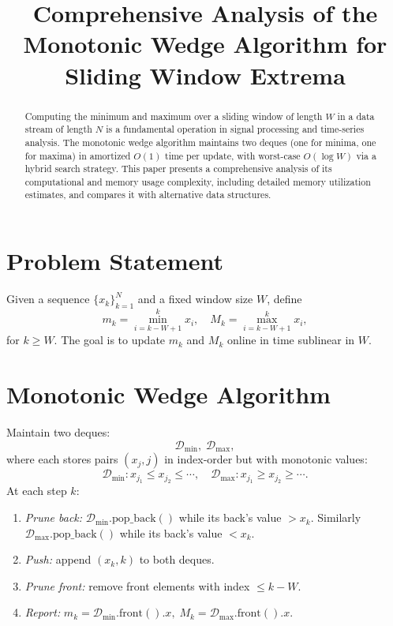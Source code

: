 \documentclass[12pt]{article}
\title{Comprehensive Analysis of the Monotonic Wedge Algorithm for Sliding Window Extrema}
\date{}
\begin{document}
\maketitle

\begin{abstract}
Computing the minimum and maximum over a sliding window of length \(W\) in a data stream of length \(N\) is a fundamental operation in signal processing and time-series analysis.  The monotonic wedge algorithm maintains two deques (one for minima, one for maxima) in amortized \(O(1)\) time per update, with worst-case \(O(\log W)\) via a hybrid search strategy.  This paper presents a comprehensive analysis of its computational and memory usage complexity, including detailed memory utilization estimates, and compares it with alternative data structures.
\end{abstract}

\section{Problem Statement}
Given a sequence \(\{x_k\}_{k=1}^N\) and a fixed window size \(W\), define
\[
m_k = \min_{i=k-W+1}^k x_i,
\quad
M_k = \max_{i=k-W+1}^k x_i,
\]
for \(k\ge W\).  The goal is to update \(m_k\) and \(M_k\) online in time sublinear in \(W\).

\section{Monotonic Wedge Algorithm}
Maintain two deques:
\[
\mathcal{D}_{\min},\;\mathcal{D}_{\max},
\]
where each stores pairs \((x_j,j)\) in index‐order but with monotonic values:
\[
\mathcal{D}_{\min}: x_{j_1}\le x_{j_2}\le\cdots,
\quad
\mathcal{D}_{\max}: x_{j_1}\ge x_{j_2}\ge\cdots.
\]
At each step \(k\):
\begin{enumerate}
  \item \emph{Prune back:}
    \(\mathcal{D}_{\min}.\mathrm{pop\_back}()\) while its back’s value \(>x_k\).
    Similarly \(\mathcal{D}_{\max}.\mathrm{pop\_back}()\) while its back’s value \(<x_k\).
  \item \emph{Push:} append \((x_k,k)\) to both deques.
  \item \emph{Prune front:} remove front elements with index \(\le k-W\).
  \item \emph{Report:}  
    \(m_k=\mathcal{D}_{\min}.\mathrm{front}().x,\;M_k=\mathcal{D}_{\max}.\mathrm{front}().x.\)
\end{enumerate}
\end{document}
